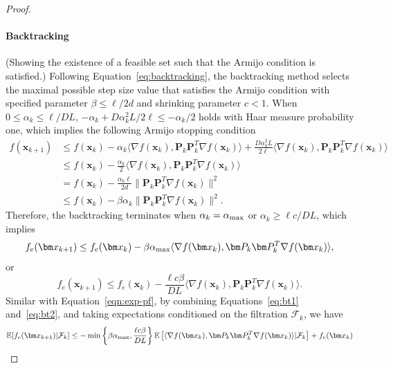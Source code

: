 \documentclass[10pt]{article} %
\numberwithin{equation}{section}
\theoremstyle{plain}
\theoremstyle{definition}
\newcommand{\<}{\langle}
\renewcommand{\>}{\rangle}
\renewcommand{\(}{\left(}
\renewcommand{\)}{\right)}
\renewcommand{\[}{\left[}
\renewcommand{\]}{\right]}
\newcommand{\alphaMax}{\alpha_\textup{max}}
\newcommand{\Lip}{L}
\begin{document}
\begin{proof}
\paragraph{Backtracking}
(Showing the existence of a feasible set such that the Armijo condition is satisfied.)
Following Equation~\eqref{eq:backtracking}, the backtracking method selects the maximal possible step size value that satisfies the Armijo condition with specified parameter $\beta \leq \ell/2d$ and shrinking parameter $c<1$. When $0\leq\alpha_k\leq \ell/D\Lip$, $-\alpha_k + D\alpha_k^2\Lip/2\ell\leq-\alpha_k/2$ holds with Haar measure probability one, which implies the following Armijo stopping condition
\begin{equation}
\begin{aligned}
f(\bm x_{k+1}) 
&\leq f(\bm x_k) -\alpha_k \langle \nabla f(\bm x_k), \bm P_k\bm P_k^T\nabla f(\bm x_k)\rangle + \frac{D\alpha_k^2\Lip}{2\ell}\langle \nabla f(\bm x_k), \bm P_k\bm P_k^T\nabla f(\bm x_k)\rangle\\
&\leq f(\bm x_k) - \frac{\alpha_k}{2}\langle \nabla f(\bm x_k), \bm P_k\bm P_k^T\nabla f(\bm x_k)\rangle\\
&= f(\bm x_k) - \frac{\alpha_k\ell}{2d}\lVert\bm P_k\bm P_k^T\nabla f(\bm x_k)\rVert^2\\
&\leq f(\bm x_k) - \beta\alpha_k\lVert\bm P_k\bm P_k^T\nabla f(\bm x_k)\rVert^2.
\end{aligned}
\end{equation}
Therefore, the backtracking terminates when $\alpha_k = \alphaMax$ or $\alpha_k \geq \ell c/D\Lip$, which implies
\begin{equation}
\label{eq:bt1}
f_e(\bm x_{k+1}) \leq f_e(\bm x_k) - \beta \alphaMax\langle \nabla f(\bm x_k), \bm P_k\bm P_k^T\nabla f(\bm x_k)\rangle,
\end{equation}
or 
\begin{equation}
\label{eq:bt2}
f_e(\bm x_{k+1}) \leq f_e(\bm x_k) - \frac{\ell c\beta}{D\Lip}\langle \nabla f(\bm x_k), \bm P_k\bm P_k^T\nabla f(\bm x_k)\rangle.
\end{equation}
Similar with Equation~\eqref{eqn:exp-pf}, by combining Equations~\eqref{eq:bt1} and~\eqref{eq:bt2}, and taking expectations conditioned on the filtration $\mathcal{F}_k$, we have
\begin{equation}
\label{eqn:pre-pl}
\begin{aligned}
\mathbb{E}[f_e(\bm x_{k+1})\vert\mathcal{F}_k]
&\leq -\min\left\{\beta \alphaMax,\frac{\ell c\beta}{D\Lip}\right\}\mathbb{E}\left[\langle\nabla f(\bm x_k),\bm P_k\bm P_k^T\nabla f(\bm x_k)\rangle\vert\mathcal{F}_k\right] + f_e(\bm x_k)\\

\end{aligned}
\end{equation}
\end{proof}
\end{document}
